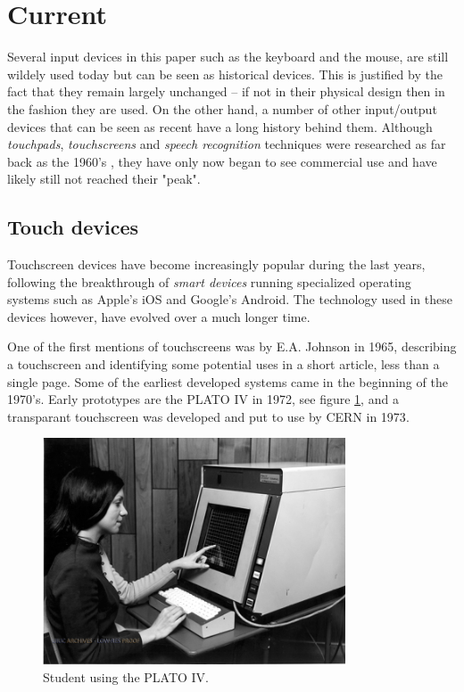 \section{Current}
\label{current}
Several input devices in this paper such as the keyboard and the mouse, are still wildely used today but can be seen as historical devices. This is justified by the fact that they remain largely unchanged -- if not in their physical design then in the fashion they are used. On the other hand, a number of other input/output devices that can be seen as recent have a long history behind them. Although \emph{touchpads}, \emph{touchscreens} and \emph{speech recognition} techniques were researched as far back as the 1960's \cite{buxton}\cite{shoebox}, they have only now began to see commercial use and have likely still not reached their "peak". 


\subsection{Touch devices}
Touchscreen devices have become increasingly popular during the last years, following the breakthrough of \emph{smart devices} running specialized operating systems such as Apple's iOS and Google's Android. The technology used in these devices however, have evolved over a much longer time.

One of the first mentions of touchscreens was by E.A. Johnson in 1965, describing a touchscreen and identifying some potential uses in a short article, less than a single page\cite{4205802}. Some of the earliest developed systems came in the beginning of the 1970's. Early prototypes are the PLATO IV\cite{buxton} in 1972, see figure \ref{platoIV}, and a transparant touchscreen was developed and put to use by CERN in 1973\cite{cern}.

\begin{figure}[]
\includegraphics[width=0.8\textwidth] {bilder/platoiv.jpg}
\caption{Student using the PLATO IV.}
\label{platoIV}
\end{figure}
\nocite{platoiv}

